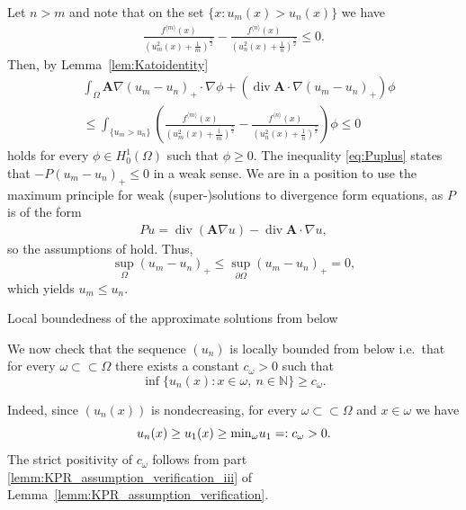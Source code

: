 \documentclass[12pt,a4paper]{amsart}
\makeatletter
\theoremstyle{definition}
\newcommand{\A}{\mathbf{A}}
\newcommand*\Div{\operatorname{div}}
\renewcommand{\subsubsection}{\@startsection{subsubsection}{3}%
    \z@{.5\linespacing\@plus.7\linespacing}{-.5em}%
    {\normalfont\bfseries}}
\makeatother
\begin{document}
Let $n>m$ and note that on the set $\{x: u_m(x) > u_n(x)\}$ we have
\begin{align*}
    \frac{f^{{\langle m \rangle}}(x) }{\left(u_m^2(x)+\frac{1}{m}\right)^{\frac{\gamma}{2}}} - \frac{f^{{\langle n \rangle}}(x) }{\left(u_n^2(x)+\frac{1}{n}\right)^{\frac{\gamma}{2}}} \leq 0.
\end{align*}
Then, by Lemma~\ref{lem:Katoidentity}
\begin{equation}\label{eq:Puplus}
\begin{split}
    &\int_\Omega \A\nabla (u_m - u_n)_+ \cdot \nabla \phi + (\Div \A \cdot \nabla (u_m - u_n)_+)\phi\\
    &\leq \int_{\{u_m>u_n\}}\left( \frac{f^{{\langle m \rangle}}(x) }{\left(u_m^2(x)+\frac{1}{m}\right)^{\frac{\gamma}{2}}} - \frac{f^{{\langle n \rangle}}(x) }{\left(u_n^2(x)+\frac{1}{n}\right)^{\frac{\gamma}{2}}} \right) \phi \leq 0
    \end{split}
\end{equation}
holds for every $\phi\in H_0^1(\Omega)$ such that $\phi\geq 0$. 
  The inequality \eqref{eq:Puplus} states that $-P(u_m-u_n)_+ \leq 0$ in a weak sense. We are in a position to use the maximum principle for weak (super-)solutions to divergence form equations, as $P$ is of the form
\begin{align*}
    Pu = \Div (\A \nabla u) - \Div \A\cdot  \nabla u,
\end{align*}
so the assumptions of \cite[Theorem~8.1]{MR1814364} hold. Thus, 
$$\sup\limits_\Omega(u_m-u_n)_+ \leq \sup\limits_{\partial \Omega}(u_m-u_n)_+ = 0,$$ which yields $u_m\leq u_n$. 


\smallskip
\noindent
\subsubsection{Local boundedness of the approximate solutions from below}

We now check that the sequence $(u_n)$ is locally bounded from below i.e.~that for every $\omega\subset\subset \Omega$ there exists a constant $c_{\omega}>0$ such that 
$$\inf\{ u_n(x): x\in \omega,\ n\in \mathbb{N}\} \ge c_\omega.$$

Indeed, since $(u_n(x))$ is nondecreasing, for every $\omega\subset\subset \Omega$ and $x\in \omega$ we have
\begin{equation}\label{porownanie}
 u_n(x)\ge u_1(x)  \ge {\rm min}_\omega u_1=: c_\omega >0.
\end{equation}
The strict positivity of $c_\omega$ follows from part \ref{lemm:KPR_assumption_verification_iii} of Lemma~\ref{lemm:KPR_assumption_verification}.
\end{document}
